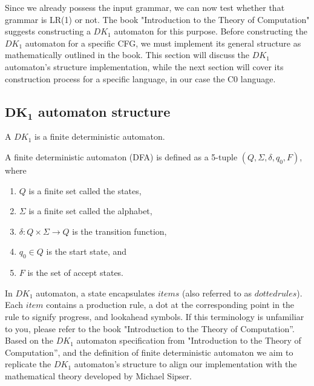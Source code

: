Since we already possess the input grammar, we can now test whether that grammar is LR(1) or not. The book "Introduction to the Theory of Computation" suggests constructing a \( DK_{1} \) automaton for this purpose. Before constructing the \( DK_{1} \) automaton for a specific CFG, we must implement its general structure as mathematically outlined in the book. This section will discuss the \( DK_{1} \) automaton’s structure implementation, while the next section will cover its construction process for a specific language, in our case the C0 language.

\vspace{20pt}

\subsection{\(\boldsymbol{DK_{1}}\) automaton structure}


A \( DK_{1} \) is a finite deterministic automaton.

\begin{definition}[2.0]
    A finite deterministic automaton (DFA) is defined as a 5-tuple  \((Q, \Sigma, \delta, q_{0}, F)\), where
    \begin{enumerate}
        \item \(Q\) is a finite set called the states,
        \item \(\Sigma\) is a finite set called the alphabet,
        \item \(\delta : Q \times \Sigma \to Q\) is the transition function,
        \item \(q_{0} \in Q\) is the start state, and
        \item \(F\) is the set of accept states.
    \end{enumerate}
\end{definition}
\setlength{\parindent}{0pt}

In \( DK_{1} \) automaton, a state encapsulates \(items\) (also referred to as \(dotted rules\)). Each \(item\) contains a production rule, a dot at the corresponding point in the rule to signify progress, and lookahead symbols. If this terminology is unfamiliar to you, please refer to the book "Introduction to the Theory of Computation”.\\

Based on the \( DK_{1} \) automaton specification from "Introduction to the Theory of Computation”, and the definition of finite deterministic automaton we aim to replicate the \( DK_{1} \) automaton's structure to align our implementation with the mathematical theory developed by Michael Sipser.

